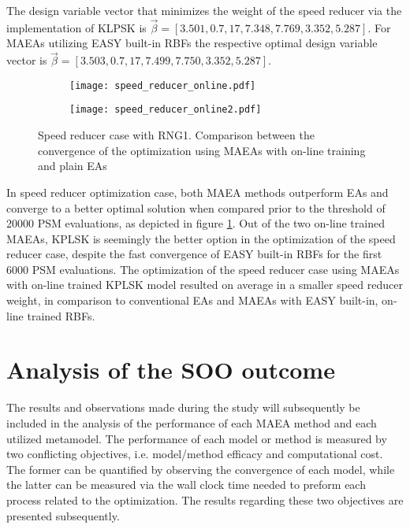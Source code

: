 The design variable vector that minimizes the weight of the speed 
reducer via the implementation of KLPSK is $\vec{β} = [3.501, 
0.7, 17, 7.348, 7.769, 3.352, 5.287]$. For MAEAs utilizing EASY 
built-in RBFs the respective optimal design variable vector is 
$\vec{β} = [3.503, 0.7, 17, 7.499, 7.750, 3.352, 5.287]$.

\begin{figure}[h!]
\centering
	\begin{subfigure}[b]{0.49\textwidth}
	\centering
	\texttt{[image: speed\_reducer\_online.pdf]}   
	\end{subfigure}
	\hfill
	\begin{subfigure}[b]{0.49\textwidth}
	\centering
	\texttt{[image: speed\_reducer\_online2.pdf]}   
	\end{subfigure}
\caption{Speed reducer case with RNG1. Comparison between the 
convergence of the optimization using MAEAs with on-line training 
and plain EAs} 
\label{fig:SMT_EASY_speed_reducer}
\end{figure}

In speed reducer optimization case, both MAEA methods 
outperform EAs and converge to a better optimal solution when 
compared prior to the threshold of 20000 PSM evaluations, as 
depicted in figure \ref{fig:SMT_EASY_speed_reducer}. Out of 
the two on-line trained MAEAs, KPLSK is seemingly the better option 
in the optimization of the speed reducer case, despite the fast 
convergence of EASY built-in RBFs for the first 6000 PSM 
evaluations. The optimization of the speed reducer case using MAEAs
with on-line trained KPLSK model resulted on average in a smaller
speed reducer weight, in comparison to conventional EAs and MAEAs
with EASY built-in, on-line trained RBFs.


\newpage


\section{Analysis of the SOO outcome}
The results and observations made during the study will 
subsequently be included in the analysis of the performance of each 
MAEA method and each utilized metamodel. The performance of each 
model or method is measured by two conflicting objectives, i.e. 
model/method efficacy and computational cost. The former can be 
quantified by observing the convergence of each model, while 
the latter can be measured via the wall clock time needed to 
preform each process related to the optimization. The results 
regarding these two objectives are presented subsequently.\\

